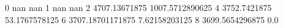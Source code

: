 0 nan nan
1 nan nan
2 4707.13671875 1007.5712890625
4 3752.7421875 53.1767578125
6 3707.18701171875 7.62158203125
8 3699.5654296875 0.0
